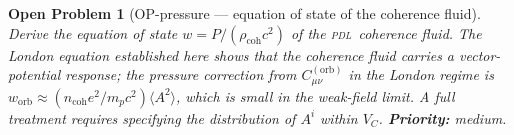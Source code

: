 \documentclass[12pt,a4paper]{article}
\newtheorem{openproblem}{Open Problem}
\newcommand{\PDL}{\textsc{pdl}}
\newcommand{\Corb}{C^{(\mathrm{orb})}}
\newcommand{\rhocoh}{\rho_{\mathrm{coh}}}
\newcommand{\ncoh}{n_{\mathrm{coh}}}
\begin{document}
\begin{openproblem}[OP-pressure --- equation of state of the coherence fluid]
\label{op:pressure}
Derive the equation of state $w = P/(\rhocoh c^2)$ of the \PDL\ coherence fluid. The London equation established here shows that the coherence fluid carries a vector-potential response; the pressure correction from $\Corb_{\mu\nu}$ in the London regime is $w_{\mathrm{orb}} \approx (\ncoh e^2/m_p c^2)\langle A^2\rangle$, which is small in the weak-field limit. A full treatment requires specifying the distribution of $A^i$ within $V_C$. \textbf{Priority:} medium.
\end{openproblem}

\clearpage


\end{document}

